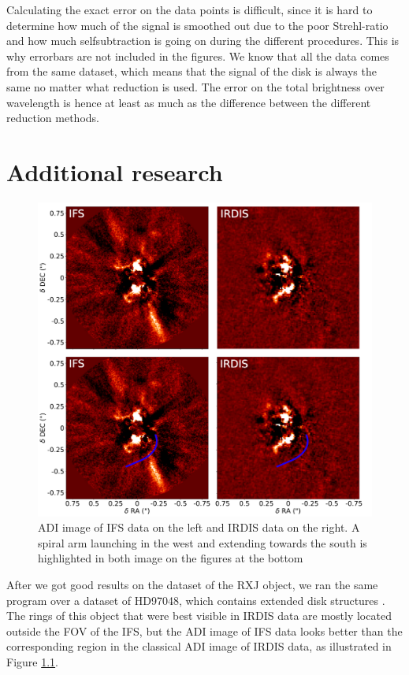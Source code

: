 \documentclass[twoside,single]{lion-msc}
\begin{document}
Calculating the exact error on the data points is difficult, since it is hard to determine how much of the signal is smoothed out due to the poor Strehl-ratio and how much selfsubtraction is going on during the different procedures. This is why errorbars are not included in the figures. We know that all the data comes from the same dataset, which means that the signal of the disk is always the same no matter what reduction is used. The error on the total brightness over wavelength is hence at least as much as the difference between the different reduction methods.

\chapter{Additional research}
\begin{figure}
\vspace{-6mm}
\centering
\includegraphics[width=\linewidth]{hdadi}
\caption{ADI image of IFS data on the left and IRDIS data on the right. A spiral arm launching in the west and extending towards the south is highlighted in both image on the figures at the bottom}
\label{fig:hdadi}
\vspace{-8mm}
\end{figure}


After we got good results on the dataset of the RXJ object, we ran the same program over a dataset of HD97048, which contains extended disk structures \citep{Ginski2016}. The rings of this object that were best visible in IRDIS data are mostly located outside the FOV of the IFS, but the ADI image of IFS data looks better than the corresponding region in the classical ADI image of IRDIS data, as illustrated in Figure \ref{fig:hdadi}.
\bigskip
\end{document}
